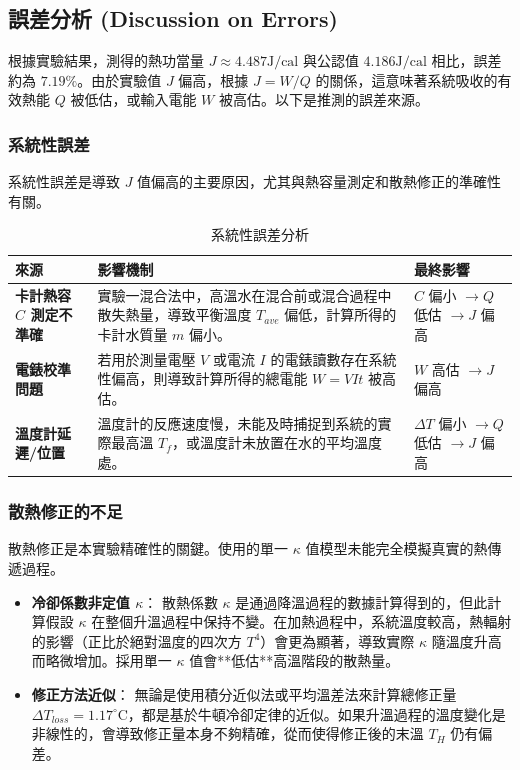 \documentclass[12pt]{article}
\begin{document}
\subsection{\textbf{誤差分析 (Discussion on Errors)}}

根據實驗結果，測得的熱功當量 $J \approx 4.487 \text{J}/\text{cal}$ 與公認值 $4.186 \text{J}/\text{cal}$ 相比，誤差約為 $\mathbf{7.19\%}$。由於實驗值 $J$ 偏高，根據 $J = W/Q$ 的關係，這意味著系統吸收的有效熱能 $Q$ 被低估，或輸入電能 $W$ 被高估。以下是推測的誤差來源。
\subsubsection{系統性誤差}

系統性誤差是導致 $J$ 值偏高的主要原因，尤其與熱容量測定和散熱修正的準確性有關。

\begin{table}[H]
    \centering
    \caption{系統性誤差分析}
    \begin{tabular}{p{4cm} p{5cm} p{4cm}}
        \toprule
        \textbf{來源} & \textbf{影響機制} & \textbf{最終影響} \\
        \midrule
        \textbf{卡計熱容 $C$ 測定不準確} & 實驗一混合法中，高溫水在混合前或混合過程中散失熱量，導致平衡溫度 $T_{ave}$ 偏低，計算所得的卡計水質量 $m$ 偏小。 & $C$ 偏小 $\rightarrow Q$ 低估 $\rightarrow J$ 偏高 \\
        \midrule
        \textbf{電錶校準問題} & 若用於測量電壓 $V$ 或電流 $I$ 的電錶讀數存在系統性偏高，則導致計算所得的總電能 $W = V I t$ 被高估。 & $W$ 高估 $\rightarrow J$ 偏高 \\
        \midrule
        \textbf{溫度計延遲/位置} & 溫度計的反應速度慢，未能及時捕捉到系統的實際最高溫 $T_f$，或溫度計未放置在水的平均溫度處。 & $\Delta T$ 偏小 $\rightarrow Q$ 低估 $\rightarrow J$ 偏高 \\
        \bottomrule
    \end{tabular}
\end{table}

\subsubsection{散熱修正的不足 }

散熱修正是本實驗精確性的關鍵。使用的單一 $\kappa$ 值模型未能完全模擬真實的熱傳遞過程。

\begin{itemize}
    \item \textbf{冷卻係數非定值 $\kappa$}：
    散熱係數 $\kappa$ 是通過降溫過程的數據計算得到的，但此計算假設 $\kappa$ 在整個升溫過程中保持不變。在加熱過程中，系統溫度較高，熱輻射的影響（正比於絕對溫度的四次方 $T^4$）會更為顯著，導致實際 $\kappa$ 隨溫度升高而略微增加。採用單一 $\kappa$ 值會**低估**高溫階段的散熱量。
    \item \textbf{修正方法近似}：
    無論是使用積分近似法或平均溫差法來計算總修正量 $\Delta T_{loss} = 1.17^\circ \text{C}$，都是基於牛頓冷卻定律的近似。如果升溫過程的溫度變化是非線性的，會導致修正量本身不夠精確，從而使得修正後的末溫 $T_H$ 仍有偏差。
\end{itemize}
\end{document}
